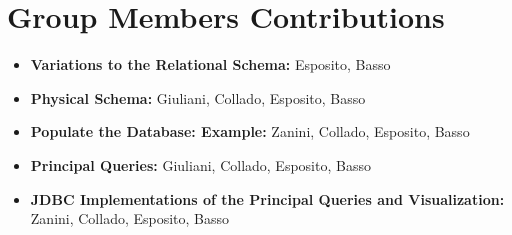 \documentclass{article}
\begin{document}
\maketitle






\section{Group Members Contributions}
\begin{itemize}
	\item \textbf{Variations to the Relational Schema:} Esposito, Basso
	\item \textbf{Physical Schema:} Giuliani, Collado, Esposito, Basso
	\item \textbf{Populate the Database: Example:} Zanini, Collado, Esposito, Basso
	\item \textbf{Principal Queries:} Giuliani, Collado, Esposito, Basso
	\item \textbf{JDBC Implementations of the Principal Queries and Visualization:} Zanini, Collado, Esposito, Basso
\end{itemize}
\end{document}
